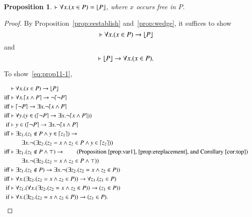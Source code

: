 \documentclass{article}
\theoremstyle{plain}
\newtheorem{prop}[thm]{Proposition}
\DeclarePairedDelimiter\ceil{\lceil}{\rceil}
\DeclarePairedDelimiter\floor{\lfloor}{\rfloor}
\begin{document}
\begin{prop} \label{prop:floor}
$\vdash \forall x . (x \in P) = \floor*{P}$, where $x$ occurs free in $P$.
\end{prop}
\begin{proof}
By Proposition~\ref{prop:eestablish} and~\ref{prop:wedge}, it suffices to show \begin{equation} \label{eq:prop11-1}
\vdash \forall x . (x \in P) \to \floor*{P}
\end{equation}
and
\begin{equation} \label{eq:prop11-2}
\vdash \floor*{P} \to \forall x . (x \in P).
\end{equation}

To show~\eqref{eq:prop11-1},

\begin{align*}
&\vdash \forall x . (x \in P) \to \floor*{P} \\
{\text{iff}}& \vdash \forall x . \ceil*{x \wedge P} \to \neg \ceil*{\neg P} \\
{\text{iff}}& \vdash \ceil*{\neg P} \to \exists x . \neg \ceil*{x \wedge P} \\
{\text{iff}}& \vdash \forall y . (y \in ( \ceil*{\neg P} \to \exists x . \neg \ceil*{x \wedge P})) \\
{\text{if}}& \vdash y \in ( \ceil*{\neg P} \to \exists x . \neg \ceil*{x \wedge P} \\
{\text{iff}}& \vdash \exists z_1 . (z_1 \not \in P \wedge y \in \ceil*{z_1}) \to \\ & \quad \quad \exists x . \neg (\exists z_2 . (z_2 = x \wedge z_2 \in P \wedge y \in \ceil*{z_2})) \\
{\text{iff}}& \vdash \exists z_1 . (z_1 \not \in P \wedge \top) \to \tag{Proposition~\ref{prop:var1}, \ref{prop:ereplacement}, and Corollary~\ref{cor:top}}\\
& \quad \quad \exists x . \neg (\exists z_2 . (z_2 = x \wedge z_2 \in P \wedge \top)) \\
{\text{iff}}& \vdash \exists z_1 . (z_1 \not \in P) \to \exists x . \neg (\exists z_2 . (z_2 = x \wedge z_2 \in P)) \\
{\text{iff}}& \vdash \forall x . (\exists z_2 . (z_2 = x \wedge z_2 \in P)) \to \forall z_1 . (z_1 \in P) \\
{\text{if}}& \vdash \forall z_1 . (\forall x . (\exists z_2 . (z_2 = x \wedge z_2 \in P)) \to (z_1 \in P)) \\
{\text{if}}& \vdash \forall x . (\exists z_2 . (z_2 = x \wedge z_2 \in P)) \to (z_1 \in P).
\end{align*}

\end{proof}
\end{document}
